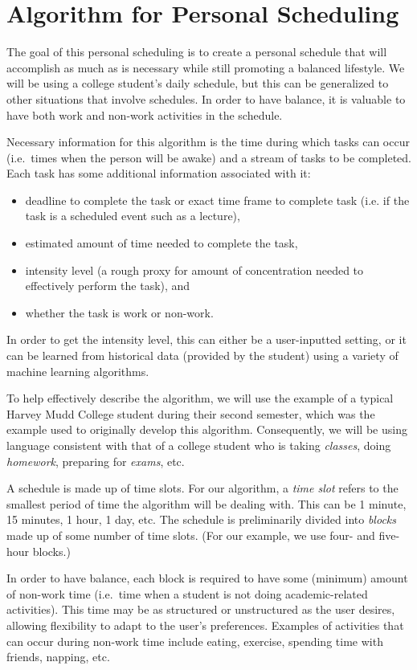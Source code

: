 \documentclass{article}
\begin{document}
\section{Algorithm for Personal Scheduling}
	The goal of this personal scheduling is to create a personal schedule that will accomplish as much as is necessary while still promoting a balanced lifestyle.
	We will be using a college student's daily schedule, but this can be generalized to other situations that involve schedules.
	In order to have balance, it is valuable to have both work and non-work activities in the schedule.

	Necessary information for this algorithm is the time during which tasks can occur (i.e.~times when the person will be awake) and a stream of tasks to be completed.
	Each task has some additional information associated with it:
	\begin{itemize}
		\item deadline to complete the task or exact time frame to complete task (i.e. if the task is a scheduled event such as a lecture),
		\item estimated amount of time needed to complete the task,
		\item intensity level (a rough proxy for amount of concentration needed to effectively perform the task), and
		\item whether the task is work or non-work.
	\end{itemize}
	In order to get the intensity level, this can either be a user-inputted setting, or it can be learned from historical data (provided by the student) using a variety of machine learning algorithms.

	To help effectively describe the algorithm, we will use the example of a typical Harvey Mudd College student during their second semester, which was the example used to originally develop this algorithm.
	Consequently, we will be using language consistent with that of a college student who is taking \emph{classes}, doing \emph{homework}, preparing for \emph{exams}, etc.

	A schedule is made up of time slots. For our algorithm, a \emph{time slot} refers to the smallest period of time the algorithm will be dealing with. This can be 1 minute, 15 minutes, 1 hour, 1 day, etc.
	The schedule is preliminarily divided into \emph{blocks} made up of some number of time slots.
	(For our example, we use four- and five-hour blocks.)
	
	In order to have balance, each block is required to have some (minimum) amount of non-work time (i.e.~time when a student is not doing academic-related activities). 
	This time may be as structured or unstructured as the user desires, allowing flexibility to adapt to the user's preferences.
	Examples of activities that can occur during non-work time include eating, exercise, spending time with friends, napping, etc.
\end{document}
